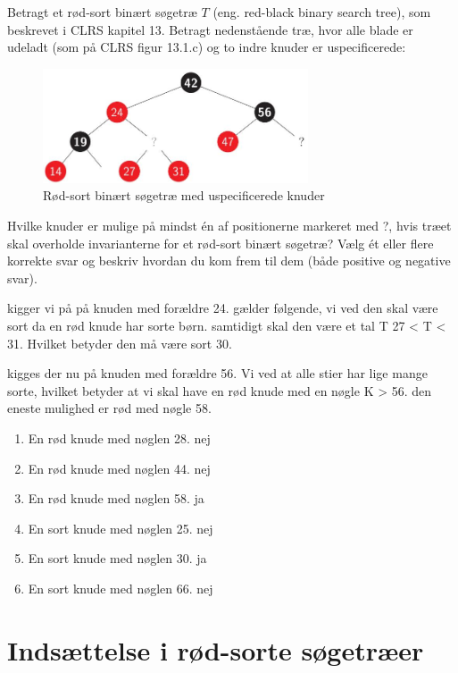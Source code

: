 \documentclass{article}
\theoremstyle{definition}
\begin{document}
Betragt et rød-sort binært søgetræ $T$ (eng. red-black binary search tree), som beskrevet i CLRS kapitel 13. Betragt nedenstående træ, hvor alle blade er udeladt (som på CLRS figur 13.1.c) og to indre knuder er uspecificerede:

\begin{figure}[H]
    \centering
    \includegraphics[width=0.7\textwidth]{_page_1_Figure_5.jpeg}
    \caption{Rød-sort binært søgetræ med uspecificerede knuder}
\end{figure}

Hvilke knuder er mulige på mindst én af positionerne markeret med ?, hvis træet skal overholde invarianterne for et rød-sort binært søgetræ? Vælg ét eller flere korrekte svar og beskriv hvordan du kom frem til dem (både positive og negative svar).

kigger vi på på knuden med forældre 24. gælder følgende, vi ved den skal være sort da en rød knude har sorte børn. samtidigt skal den være et tal T 27 < T < 31. Hvilket betyder den må være sort 30.

kigges der nu på knuden med forældre 56. Vi ved at alle stier har lige mange sorte, hvilket betyder at vi skal have en rød knude med en nøgle K > 56. den eneste mulighed er rød med nøgle 58.

\begin{enumerate}
\item En rød knude med nøglen 28. nej
\item En rød knude med nøglen 44. nej
\item En rød knude med nøglen 58. ja
\item En sort knude med nøglen 25. nej
\item En sort knude med nøglen 30. ja  
\item En sort knude med nøglen 66. nej
\end{enumerate}

\section{Indsættelse i rød-sorte søgetræer}
\end{document}

